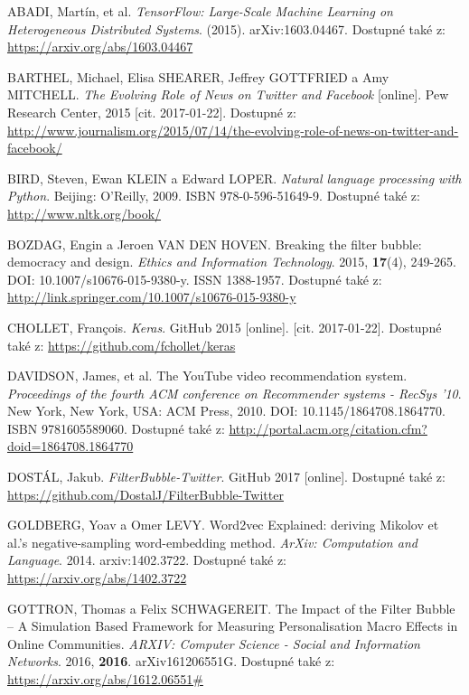 \documentclass[12pt, a4paper]{article}
\numberwithin{equation}{section} 	%
\begin{document}
\newpage
\begin{thebibliography}{99}

    ABADI, Martín, et al. \textit{TensorFlow: Large-Scale Machine Learning on Heterogeneous Distributed Systems}. (2015). arXiv:1603.04467. Dostupné také z: \url{https://arxiv.org/abs/1603.04467}

    BARTHEL, Michael, Elisa SHEARER, Jeffrey GOTTFRIED a Amy MITCHELL. \textit{The Evolving Role of News on Twitter and Facebook} [online]. Pew Research Center, 2015 [cit. 2017-01-22]. Dostupné z: \url{http://www.journalism.org/2015/07/14/the-evolving-role-of-news-on-twitter-and-facebook/}

    BIRD, Steven, Ewan KLEIN a Edward LOPER. \textit{Natural language processing with Python}. Beijing: O'Reilly, 2009. ISBN 978-0-596-51649-9. Dostupné také z: \url{http://www.nltk.org/book/}

    BOZDAG, Engin a Jeroen VAN DEN HOVEN. Breaking the filter bubble: democracy and design. \textit{Ethics and Information Technology}. 2015, \textbf{17}(4), 249-265. DOI: 10.1007/s10676-015-9380-y. ISSN 1388-1957. Dostupné také z: \url{http://link.springer.com/10.1007/s10676-015-9380-y}

    CHOLLET, Fran\c{c}ois. \textit{Keras}. GitHub 2015 [online]. [cit. 2017-01-22]. Dostupné také z: \url{https://github.com/fchollet/keras}

    DAVIDSON, James, et al. The YouTube video recommendation system. \textit{Proceedings of the fourth ACM conference on Recommender systems - RecSys '10}. New York, New York, USA: ACM Press, 2010. DOI: 10.1145/1864708.1864770. ISBN 9781605589060. Dostupné také z: \url{http://portal.acm.org/citation.cfm?doid=1864708.1864770}

    DOSTÁL, Jakub. \textit{FilterBubble-Twitter}. GitHub 2017 [online]. Dostupné také z: \url{https://github.com/DostalJ/FilterBubble-Twitter}

    GOLDBERG, Yoav a Omer LEVY. Word2vec Explained: deriving Mikolov et al.'s negative-sampling word-embedding method. \textit{ArXiv: Computation and Language}. 2014. arxiv:1402.3722. Dostupné také z: \url{https://arxiv.org/abs/1402.3722}

    GOTTRON, Thomas a Felix SCHWAGEREIT. The Impact of the Filter Bubble -- A Simulation Based Framework for Measuring Personalisation Macro Effects in Online Communities. \textit{ARXIV: Computer Science - Social and Information Networks}. 2016, \textbf{2016}. arXiv161206551G. Dostupné také z: \url{https://arxiv.org/abs/1612.06551\#}


\end{thebibliography}
\end{document}
